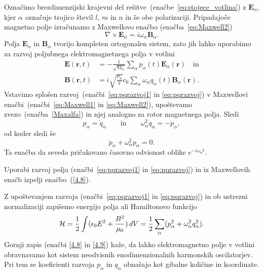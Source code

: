 Označimo brezdimenzijski krajevni del rešitve~(enačbe~\ref{eq:stojece_votlina}) z 
$\mathbf{E}_{\alpha}$, kjer $\alpha$
označuje trojico števil $l$, $m$ in $n$ in še obe polarizaciji. 
Pripadajoče magnetno polje izračunamo z Maxwellovo enačbo (enačba~\ref{eq:Maxwell2}) 
\begin{equation}
\nabla\times\mathbf{E}_{\alpha}=i\omega_\alpha\mathbf{B}_{\alpha}.
\label{Maxalfa}
\end{equation}
Polja $\mathbf{E}_{\alpha}$ in $\mathbf{B}_{\alpha}$ tvorijo kompleten ortogonalen
sistem, zato jih lahko uporabimo za razvoj poljubnega elektromagnetnega polja v votlini
\begin{align}
\mathbf{E}(\mathbf{r},t) & =  -\frac{1}{\sqrt{V\epsilon_{0}}}
\sum_{\alpha}p_{\alpha}(t)\mathbf{E}_{\alpha}(\mathbf{r}) \quad \mathrm{in} \label{eq:pqrazvoj1}\\
\mathbf{B}(\mathbf{r},t) & =  i\sqrt{\frac{\mu_{0}}{V}}c_0\sum_{\alpha}
\omega_{\alpha}q_{\alpha}(t)\mathbf{B}_{\alpha}(\mathbf{r}).
\label{eq:pqrazvoj}
\end{align}
Vstavimo splošen razvoj~(enačbi~\ref{eq:pqrazvoj1} in \ref{eq:pqrazvoj}) v 
Maxwellovi enačbi~(enačbi~\ref{eq:Maxwell1} in \ref{eq:Maxwell2}), 
upoštevamo zvezo~(enačba~\ref{Maxalfa}) in njej analogno za rotor magnetnega polja. Sledi
\begin{equation}
p_{\alpha}=\dot{q}_{\alpha} \qquad \mathrm{in} \qquad 
\omega_{\alpha}^{2}q_{\alpha}=-\dot{p}_{\alpha},
\label{4.7}
\end{equation}
od koder sledi še 
\begin{equation}
\ddot{p}_{\alpha}+\omega_{\alpha}^{2}p_{\alpha}=0.
\label{4.8}
\end{equation}
Ta enačba da seveda pričakovano časovno odvisnost oblike $e^{-i \omega_\alpha t}$.

\begin{definition}
 Uporabi razvoj polja (enačbi~\ref{eq:pqrazvoj1} in \ref{eq:pqrazvoj}) 
 in iz Maxwellovih enačb izpelji
 enačbo~(\ref{4.8}).
\end{definition}

Z upoštevanjem razvoja (enačbi~\ref{eq:pqrazvoj1} in \ref{eq:pqrazvoj}) in ob ustrezni
normalizaciji zapišemo energijo 
polja ali Hamiltonovo 
funkcijo
\begin{equation}
{\cal H}=\frac{1}{2}\int(\epsilon_{0}E^{2}+\frac{B^{2}}{\mu_0})\, 
dV=\frac{1}{2}\sum_{\alpha}(p_{\alpha}^{2}+\omega_{\alpha}^{2}q_{\alpha}^{2}).
\label{4.9}
\end{equation}
Gornji zapis (enačbi \ref{4.8} in \ref{4.9}) kaže, 
da lahko elektromagnetno polje v votlini
obravnavamo kot sistem neodvisnih enodimenzionalnih harmonskih oscilatorjev. 
Pri tem se koeficienti razvoja $p_{\alpha}$ in $q_{\alpha}$ obnašajo kot
gibalne količine in koordinate. 

